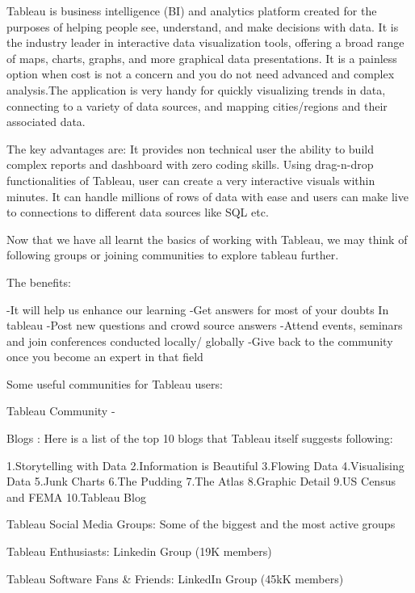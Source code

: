 \documentclass[]{book}
\theoremstyle{definition}
\theoremstyle{definition}
\theoremstyle{definition}
\theoremstyle{remark}
\begin{document}
Tableau is business intelligence (BI) and analytics platform created for
the purposes of helping people see, understand, and make decisions with
data. It is the industry leader in interactive data visualization tools,
offering a broad range of maps, charts, graphs, and more graphical data
presentations. It is a painless option when cost is not a concern and
you do not need advanced and complex analysis.The application is very
handy for quickly visualizing trends in data, connecting to a variety of
data sources, and mapping cities/regions and their associated data.

The key advantages are: It provides non technical user the ability to
build complex reports and dashboard with zero coding skills. Using
drag-n-drop functionalities of Tableau, user can create a very
interactive visuals within minutes. It can handle millions of rows of
data with ease and users can make live to connections to different data
sources like SQL etc.

\citep{tableau_interactive_viz}

Now that we have all learnt the basics of working with Tableau, we may
think of following groups or joining communities to explore tableau
further.

The benefits:

-It will help us enhance our learning -Get answers for most of your
doubts In tableau -Post new questions and crowd source answers -Attend
events, seminars and join conferences conducted locally/ globally -Give
back to the community once you become an expert in that field

Some useful communities for Tableau users:

Tableau Community - \citep{Tableau_Community}

Blogs : Here is a list of the top 10 blogs that Tableau itself suggests
following:

\citep{Top_10_Blogs}

1.Storytelling with Data 2.Information is Beautiful 3.Flowing Data
4.Visualising Data 5.Junk Charts 6.The Pudding 7.The Atlas 8.Graphic
Detail 9.US Census and FEMA 10.Tableau Blog

Tableau Social Media Groups: Some of the biggest and the most active
groups

Tableau Enthusiasts: Linkedin Group (19K members)

Tableau Software Fans \& Friends: LinkedIn Group (45kK members)

\citep{LinkedIn_Groups}
\end{document}
